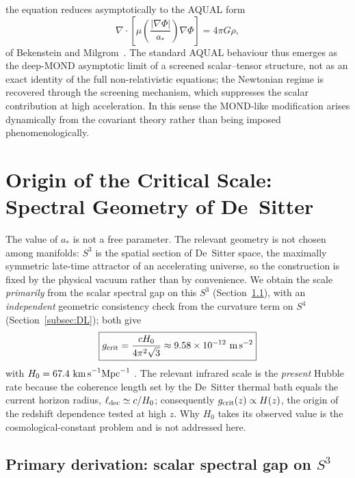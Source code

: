 \documentclass[11pt,a4paper]{article}
\begin{document}
the equation reduces asymptotically to the AQUAL form
\begin{equation}
  \nabla \cdot \left[
    \mu\!\left(\frac{|\nabla \Phi|}{a_*}\right)\nabla \Phi
  \right]
  = 4\pi G \rho,
\end{equation}
of Bekenstein and Milgrom~\cite{Bekenstein1984}. The standard AQUAL behaviour thus emerges
as the deep-MOND asymptotic limit of a screened scalar--tensor structure, not as an exact
identity of the full non-relativistic equations; the Newtonian regime is recovered through
the screening mechanism, which suppresses the scalar contribution at high acceleration. In
this sense the MOND-like modification arises dynamically from the covariant theory rather
than being imposed phenomenologically.

\section{Origin of the Critical Scale: Spectral Geometry of De~Sitter}
\label{sec:gcrit}

The value of $a_*$ is not a free parameter. The relevant geometry is not chosen among
manifolds: $S^3$ is the spatial section of De~Sitter space, the maximally symmetric
late-time attractor of an accelerating universe, so the construction is fixed by the
physical vacuum rather than by convenience. We obtain the scale \emph{primarily} from the
scalar spectral gap on this $S^3$ (Section~\ref{subsec:BL}), with an \emph{independent}
geometric consistency check from the curvature term on $S^4$ (Section~\ref{subsec:DL});
both give
\begin{equation}
  \boxed{g_{\rm crit} = \frac{cH_0}{4\pi^2\sqrt{3}}\approx 9.58\times10^{-12}\ \text{m\,s}^{-2}}
  \label{eq:gcrit}
\end{equation}
with $H_0 = 67.4\ \text{km\,s}^{-1}\text{Mpc}^{-1}$ \cite{Planck2020}. The relevant infrared
scale is the \emph{present} Hubble rate because the coherence length set by the De~Sitter
thermal bath equals the current horizon radius, $\ell_{\rm dec}\simeq c/H_0$; consequently
$g_{\rm crit}(z)\propto H(z)$, the origin of the redshift dependence tested at high $z$.
Why $H_0$ takes its observed value is the cosmological-constant problem and is not
addressed here.

\subsection{Primary derivation: scalar spectral gap on \texorpdfstring{$S^3$}{S3}}
\label{subsec:BL}
\end{document}
